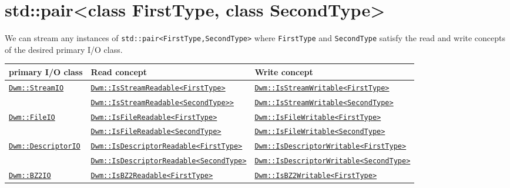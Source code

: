 \begin{minipage}{\textwidth}
\section{\ttfamily std::pair<class FirstType, class SecondType>}
We can stream any instances of \texttt{std::pair<FirstType,SecondType>}
where \texttt{FirstType} and \texttt{SecondType} satisfy the read
and write concepts of the desired primary I/O class.
\vspace{1ex}

\begin{small}
\begin{tabular}{lll}
\textbf{primary I/O class} & \textbf{Read concept} & \textbf{Write concept} \\ \hline
\multirow{2}{*}{\hyperref[section:DwmStreamIOClass]{\texttt{Dwm::StreamIO}}} & \hyperref[concept:DwmIsStreamReadable]{\texttt{Dwm::IsStreamReadable<FirstType>}} & \hyperref[concept:DwmIsStreamWritable]{\texttt{Dwm::IsStreamWritable<FirstType>}} \\
 & \hyperref[concept:DwmIsStreamReadable]{\texttt{Dwm::IsStreamReadable<SecondType>>}} & \hyperref[concept:DwmIsStreamWritable]{\texttt{Dwm::IsStreamWritable<SecondType>}} \\ \hline
\multirow{2}{*}{\hyperref[section:DwmFileIOClass]{\texttt{Dwm::FileIO}}} & \hyperref[concept:DwmIsFileReadable]{\texttt{Dwm::IsFileReadable<FirstType>}} & \hyperref[concept:DwmIsFileWritable]{\texttt{Dwm::IsFileWritable<FirstType>}} \\
 & \hyperref[concept:DwmIsFileReadable]{\texttt{Dwm::IsFileReadable<SecondType>}} & \hyperref[concept:DwmIsFileWritable]{\texttt{Dwm::IsFileWritable<SecondType>}} \\ \hline
\multirow{2}{*}{\hyperref[section:DwmDescriptorIOClass]{\texttt{Dwm::DescriptorIO}}} & \hyperref[concept:DwmIsDescriptorReadable]{\texttt{Dwm::IsDescriptorReadable<FirstType>}} & \hyperref[concept:DwmIsDescriptorWritable]{\texttt{Dwm::IsDescriptorWritable<FirstType>}} \\
 & \hyperref[concept:DwmIsDescriptorReadable]{\texttt{Dwm::IsDescriptorReadable<SecondType>}} & \hyperref[concept:DwmIsDescriptorWritable]{\texttt{Dwm::IsDescriptorWritable<SecondType>}} \\ \hline
\multirow{2}{*}{\hyperref[section:DwmBZ2IOClass]{\texttt{Dwm::BZ2IO}}} & \hyperref[concept:DwmIsBZ2Readable]{\texttt{Dwm::IsBZ2Readable<FirstType>}} & \hyperref[concept:DwmIsBZ2Writable]{\texttt{Dwm::IsBZ2Writable<FirstType>}} \\

\end{tabular}
\end{small}
\end{minipage}
